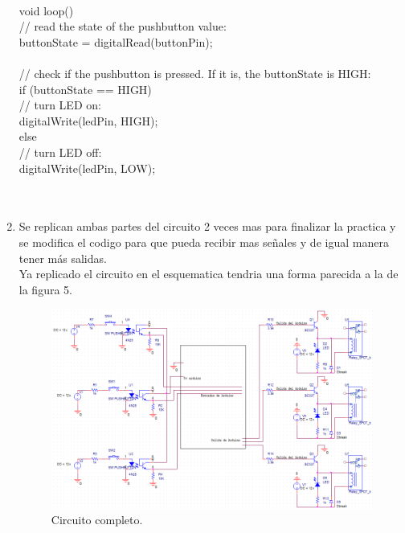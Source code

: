 \documentclass[letterpaper]{article}
\begin{document}
\begin{large}
\begin{enumerate}
\\
        void loop() {\\
            // read the state of the pushbutton value:\\
            buttonState = digitalRead(buttonPin);\\
\\
        // check if the pushbutton is pressed. If it is, the buttonState is HIGH:\\
        if (buttonState == HIGH) {\\
         // turn LED on:\\
         digitalWrite(ledPin, HIGH);\\
        } else {\\
            // turn LED off:\\
            digitalWrite(ledPin, LOW);\\
        }\\
        }\\
        \item Se replican ambas partes del circuito 2 veces mas para finalizar la practica y se modifica el codigo para que pueda recibir mas señales y de igual manera tener más salidas.\\
        Ya replicado el circuito en el esquematica tendria una forma parecida a la de la figura 5.\\
        \begin{figure}[htbp]
            \centering
            \includegraphics[scale=0.5]{IMG/cir3.png}
            \caption{Circuito completo.}
            \label{fig:cir3}
        \end{figure}
        

\end{enumerate}
\end{large}
\end{document}
